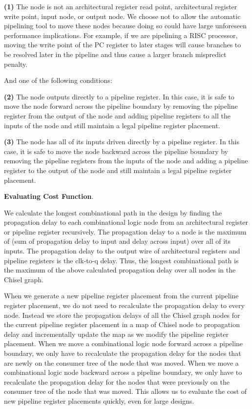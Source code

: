 {\bf (1)} 
The node is not an architectural register read point, architectural register write point, input node, or output node. We choose not to allow the automatic pipelining tool to move these nodes because doing so could have large unforeseen performance implications. For example, if we are pipelining a RISC processor, moving the write point of the PC register to later stages will cause branches to be resolved later in the pipeline and thus cause a larger branch mispredict penalty.

And one of the following conditions:

{\bf (2)}  
The node outputs directly to a pipeline register. In this case, it is safe to move the node forward across the pipeline boundary by removing the pipeline register from the output of the node and adding pipeline registers to all the inputs of the node and still maintain a legal pipeline register placement. 

{\bf (3)} 
The node has all of its inputs driven directly by a pipeline register. In this case, it is safe to move the node backward across the pipeline boundary by removing the pipeline registers from the inputs of the node and adding a pipeline register to the output of the node and still maintain a legal pipeline register placement.


{\bf Evaluating Cost Function}.

We calculate the longest combinational path in the design by finding the propagation delay to each combinational logic node from an architectural register or pipeline register recursively. The propagation delay to a node is the maximum of (sum of propagation delay to input and delay across input) over all of its inputs. The propagation delay to the output wire of architectural registers and pipeline registers is the clk-to-q delay.  Thus, the longest combinational path is the maximum of the above calculated propagation delay over all nodes in the Chisel graph.

When we generate a new pipeline register placement from the current pipeline register placement, we do not need to recalculate the propagation delay to every node. Instead we store the propagation delays of all the Chisel graph nodes for the current pipeline register placement in a map of Chisel node to propagation delay and incrementally update the map as we modify the pipeline register placement. When we move a combinational logic node forward across a pipeline boundary, we only have to recalculate the propagation delay for the nodes that are newly on the consumer tree of the node that was moved. When we move a combinational logic node backward across a pipeline boundary, we only have to recalculate the propagation delay for the nodes that were previously on the consumer tree of the node that was moved. This allows us to evaluate the cost of new pipeline register placements quickly, even for large designs.


